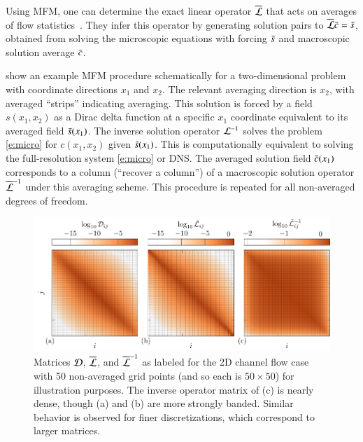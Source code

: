 \documentclass[11pt,sort&compress]{elsarticle}
\begin{document}
Using MFM, one can determine the exact linear operator $\overline{\mathcal{L}}$ that acts on averages of flow statistics~\citep{maniMacroscopicForcingMethod2021}.
They infer this operator by generating solution pairs to $\overline{\mathcal{L}} \bar{c} = \bar{s}$, obtained from solving the microscopic equations with forcing $\bar{s}$ and macroscopic solution average $\bar{c}$.

 show an example MFM procedure schematically for a two-dimensional problem with coordinate directions $x_1$ and $x_2$.
The relevant averaging direction is $x_2$, with averaged ``strips'' indicating averaging.
This solution is forced by a field $s(x_1,x_2)$ as a Dirac delta function  at a specific $x_1$ coordinate equivalent to its averaged field $\bar{s}(x_1)$.
The inverse solution operator $\mathcal{L}^{-1}$ solves the problem \cref{e:micro} for $c(x_1,x_2)$ given $\bar{s}(x_1)$.
This is computationally equivalent to solving the full-resolution system \cref{e:micro} or DNS.
The averaged solution field $\bar{c}(x_1)$ corresponds to a column (``recover a column'') of a macroscopic solution operator $\overline{\mathcal{L}}^{-1}$ under this averaging scheme.
This procedure is repeated for all non-averaged degrees of freedom.

\begin{figure}
    \centering
    \includegraphics{figures/matrices.pdf}
    \caption{
        Matrices $\mathcal{D}$, $\overline{\mathcal{L}}$, and $\overline{\mathcal{L}}^{-1}$ as labeled for the 2D channel flow case with 50 non-averaged grid points (and so each is $50 \times 50$) for illustration purposes.
        The inverse operator matrix of (c) is nearly dense, though (a) and (b) are more strongly banded.
        Similar behavior is observed for finer discretizations, which correspond to larger matrices.
    } 
    \label{fig:mfmeddy}
\end{figure}
\end{document}
